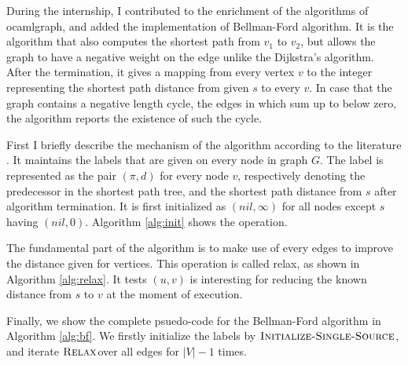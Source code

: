 \documentclass[a4paper,12pt]{article}
\begin{document}
During the internship, I contributed to the enrichment of the
algorithms of ocamlgraph, and added the implementation of Bellman-Ford
algorithm. It is the algorithm that also computes the shortest path
from $v_1$ to $v_2$, but allows the graph to have a negative weight on
the edge unlike the Dijkstra's algorithm. After the termination, it
gives a mapping from every vertex $v$ to the integer representing the
shortest path distance from given $s$ to every $v$. In case that the
graph contains a negative length cycle, the edges in which sum up to
below zero, the algorithm reports the existence of such the cycle.

First I briefly describe the mechanism of the algorithm according to
the literature \cite{algo}. It maintains the labels that are given on
every node in graph $G$. The label is represented as the pair
$(\pi,d)$ for every node $v$, respectively denoting the predecessor in
the shortest path tree, and the shortest path distance from $s$ after
algorithm termination. It is first initialized as $(nil,\infty)$ for
all nodes except $s$ having $(nil,0)$. Algorithm \ref{alg:init} shows
the operation.

\newcommand{\initBF}{\ensuremath{\mbox{\sc Initialize-Single-Source}}}
\begin{algorithm}
\caption{$\initBF(G,s)$}\label{alg:init}
\begin{algorithmic}[1]
\ENDFOR
{}
\end{algorithmic}
\end{algorithm}

The fundamental part of the algorithm is to make use of every edges to
improve the distance given for vertices. This operation is called
relax, as shown in Algorithm \ref{alg:relax}. It tests $(u,v)$ is
interesting for reducing the known distance from $s$ to $v$ at the
moment of execution.

\newcommand{\relaxBF}{\ensuremath{\mbox{\sc Relax}}}
\begin{algorithm}
\caption{$\relaxBF(u,v,l)$}\label{alg:relax}
\begin{algorithmic}[1]
\ENDIF
\end{algorithmic}
\end{algorithm}

Finally, we show the complete psuedo-code for the Bellman-Ford
algorithm in Algorithm \ref{alg:bf}. We firstly initialize the labels
by \initBF, and iterate \relaxBF over all edges for $|V|-1$ times.
\end{document}

